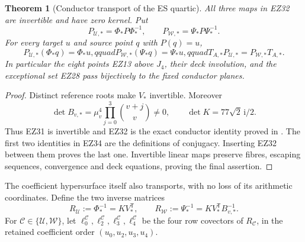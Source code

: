 \documentclass[11pt]{article}
\newtheorem{theorem}{Theorem}[section]
\theoremstyle{definition}\newtheorem{definition}[theorem]{Definition}
\theoremstyle{remark}\newtheorem{remark}[theorem]{Remark}
\newcommand{\ii}{\mathrm i}
\begin{document}
\begin{theorem}[Conductor transport of the ES quartic]
All three maps in EZ32 are invertible and have zero kernel.  Put
\begin{equation}
 P_{\mathcal U,*}=\Phi_*P\Phi_*^{-1},\qquad
 P_{\mathcal W,*}=\Psi_*P\Psi_*^{-1}.                  \tag{EZ33}
\end{equation}
For every target \(u\) and source point \(q\) with \(P(q)=u\),
\begin{equation}
 P_{\mathcal U,*}(\Phi_*q)=\Phi_*u,qquad
 P_{\mathcal W,*}(\Psi_*q)=\Psi_*u,qquad
 T_{A,*}P_{\mathcal U,*}=P_{\mathcal W,*}T_{A,*}.      \tag{EZ34}
\end{equation}
In particular the eight points EZ13 above \(J_4\), their deck involution,
and the exceptional set EZ28 pass bijectively to the fixed conductor planes.
\end{theorem}

\begin{proof}
Distinct reference roots make \(V_*\) invertible.  Moreover
\[
 \det B_{v,*}=\mu_v^4\prod_{j=0}^3\binom{v+j}{v}\ne0,
 \qquad \det K=77\sqrt2\,\ii/2.
\]
Thus EZ31 is invertible and EZ32 is the exact conductor identity proved in
\cite[FC26--FC35]{SignedCover}.  The first two identities in EZ34 are the
definitions of conjugacy.  Inserting EZ32 between them proves the last one.
Invertible linear maps preserve fibres, escaping sequences, convergence and
deck equations, proving the final assertion.
\end{proof}

The coefficient hypersurface itself also transports, with no loss of its
arithmetic coordinates.  Define the two inverse matrices
\begin{equation}
 R_{\mathcal U}:=\Phi_*^{-1}=KV_*^{\mathsf T},\qquad
 R_{\mathcal W}:=\Psi_*^{-1}=KV_*^{\mathsf T}B_{v,*}^{-1}.       \tag{EZ34a}
\end{equation}
For \(\mathcal C\in\{\mathcal U,\mathcal W\}\), let
\(\ell^{\mathcal C}_0,\ell^{\mathcal C}_2,
\ell^{\mathcal C}_3,\ell^{\mathcal C}_4\) be the four row covectors of
\(R_{\mathcal C}\), in the retained coefficient order
\((u_0,u_2,u_3,u_4)\).
\end{document}
